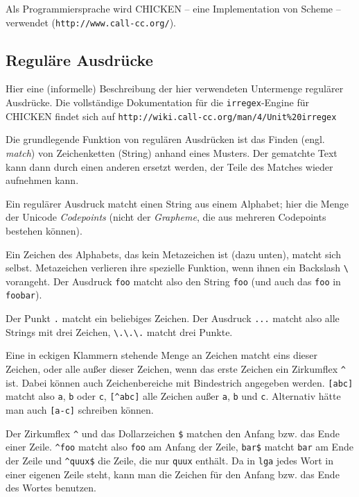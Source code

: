 \documentclass[12pt,a4paper,normalheadings]{scrartcl}
\def\bel#1{\textit{#1}}
\def\tt#1{\texttt{#1}}
\begin{document}
Als Programmiersprache wird CHICKEN -- eine Implementation von Scheme --
verwendet (\tt{http://www.call-cc.org/}).

\subsection{Reguläre Ausdrücke}

Hier eine (informelle)
Beschreibung der hier verwendeten Untermenge regulärer Ausdrücke.
Die vollständige Dokumentation für die \tt{irregex}-Engine für
CHICKEN findet sich auf
\tt{http://wiki.call-cc.org/man/4/Unit\%20irregex}

Die grundlegende Funktion von regulären Ausdrücken ist das
Finden (engl. \bel{match}) von Zeichenketten (String) anhand eines Musters.
Der gematchte Text kann dann durch einen anderen ersetzt werden,
der Teile des Matches wieder aufnehmen kann.

Ein regulärer Ausdruck matcht einen String aus einem Alphabet;
hier die Menge der Unicode \emph{Codepoints} (nicht
der \emph{Grapheme}, die aus mehreren Codepoints bestehen können).

Ein Zeichen des Alphabets, das kein Metazeichen ist (dazu unten),
matcht sich selbst.
Metazeichen verlieren ihre spezielle Funktion,
wenn ihnen ein Backslash \tt{\textbackslash} vorangeht.
Der Ausdruck \tt{foo} matcht also den String \tt{foo}
(und auch das \tt{foo} in \tt{foobar}).

Der Punkt \tt{.} matcht ein beliebiges Zeichen.
Der Ausdruck \tt{...} matcht also alle Strings mit drei Zeichen,
\tt{\textbackslash.\textbackslash.\textbackslash.} matcht drei Punkte.

Eine in eckigen Klammern stehende Menge an Zeichen matcht eins dieser Zeichen,
oder alle außer dieser Zeichen,
wenn das erste Zeichen ein Zirkumflex \tt{\textasciicircum} ist.
Dabei können auch Zeichenbereiche mit Bindestrich angegeben werden.
\tt{[abc]} matcht also \tt{a}, \tt{b} oder \tt{c},
\tt{[\textasciicircum{}abc]} alle Zeichen außer \tt{a}, \tt{b} und \tt{c}.
Alternativ hätte man auch \tt{[a-c]} schreiben können.

Der Zirkumflex \tt{\textasciicircum} und das Dollarzeichen \tt{\$}
matchen den Anfang bzw. das Ende einer Zeile.
\tt{\textasciicircum{}foo} matcht also \tt{foo} am Anfang der Zeile,
\tt{bar\$} matcht \tt{bar} am Ende der Zeile
und \tt{\textasciicircum{}quux\$} die Zeile, die nur \tt{quux} enthält.
Da in \tt{lga} jedes Wort in einer eigenen Zeile steht,
kann man die Zeichen für den Anfang bzw. das Ende des Wortes benutzen.
\end{document}
